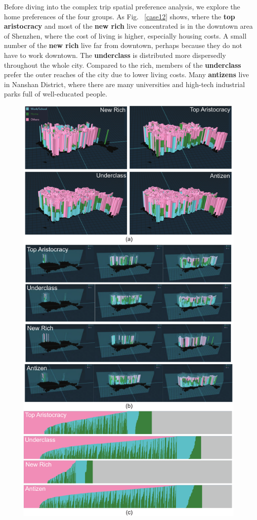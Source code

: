 \documentclass{ieeeaccess}
\begin{document}
Before diving into the complex trip spatial preference analysis, we explore the home preferences of the four groups. As Fig. ~\ref{case12} shows, where the \textbf{top aristocracy} and most of the \textbf{new rich} live concentrated is in the downtown area of Shenzhen, where the cost of living is higher, especially housing costs. A small number of the \textbf{new rich} live far from downtown, perhaps because they do not have to work downtown. The \textbf{underclass} is distributed more dispersedly throughout the whole city. Compared to the rich, members of the \textbf{underclass} prefer the outer reaches of the city due to lower living costs. Many \textbf{antizens} live in Nanshan District, where there are many universities and high-tech industrial parks full of well-educated people.


\begin{figure}[htb!]
 \centering
 \includegraphics[width=\columnwidth]{pictures/case1_3_new-eps-converted-to.pdf}

\end{figure}
\end{document}

